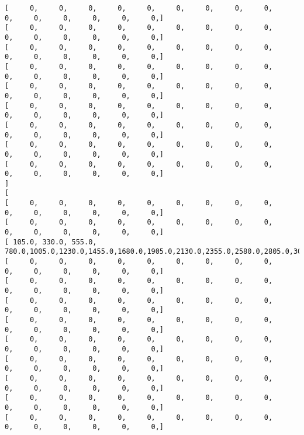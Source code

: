 \documentclass[11pt]{article}
\begin{document}
\begin{Verbatim}[commandchars=\\\{\}]
[      0,      0,      0,      0,      0,      0,      0,      0,      0,      0,      0,      0,      0,      0,      0, ]
[      0,      0,      0,      0,      0,      0,      0,      0,      0,      0,      0,      0,      0,      0,      0, ]
[      0,      0,      0,      0,      0,      0,      0,      0,      0,      0,      0,      0,      0,      0,      0, ]
[      0,      0,      0,      0,      0,      0,      0,      0,      0,      0,      0,      0,      0,      0,      0, ]
[      0,      0,      0,      0,      0,      0,      0,      0,      0,      0,      0,      0,      0,      0,      0, ]
[      0,      0,      0,      0,      0,      0,      0,      0,      0,      0,      0,      0,      0,      0,      0, ]
[      0,      0,      0,      0,      0,      0,      0,      0,      0,      0,      0,      0,      0,      0,      0, ]
[      0,      0,      0,      0,      0,      0,      0,      0,      0,      0,      0,      0,      0,      0,      0, ]
[      0,      0,      0,      0,      0,      0,      0,      0,      0,      0,      0,      0,      0,      0,      0, ]
]
[
[      0,      0,      0,      0,      0,      0,      0,      0,      0,      0,      0,      0,      0,      0,      0, ]
[      0,      0,      0,      0,      0,      0,      0,      0,      0,      0,      0,      0,      0,      0,      0, ]
[  105.0,  330.0,  555.0,  780.0, 1005.0, 1230.0, 1455.0, 1680.0, 1905.0, 2130.0, 2355.0, 2580.0, 2805.0, 3030.0, 3255.0, ]
[      0,      0,      0,      0,      0,      0,      0,      0,      0,      0,      0,      0,      0,      0,      0, ]
[      0,      0,      0,      0,      0,      0,      0,      0,      0,      0,      0,      0,      0,      0,      0, ]
[      0,      0,      0,      0,      0,      0,      0,      0,      0,      0,      0,      0,      0,      0,      0, ]
[      0,      0,      0,      0,      0,      0,      0,      0,      0,      0,      0,      0,      0,      0,      0, ]
[      0,      0,      0,      0,      0,      0,      0,      0,      0,      0,      0,      0,      0,      0,      0, ]
[      0,      0,      0,      0,      0,      0,      0,      0,      0,      0,      0,      0,      0,      0,      0, ]
[      0,      0,      0,      0,      0,      0,      0,      0,      0,      0,      0,      0,      0,      0,      0, ]
[      0,      0,      0,      0,      0,      0,      0,      0,      0,      0,      0,      0,      0,      0,      0, ]
[      0,      0,      0,      0,      0,      0,      0,      0,      0,      0,      0,      0,      0,      0,      0, ]

\end{Verbatim}
\end{document}
